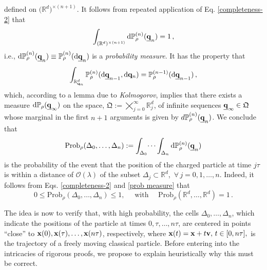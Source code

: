 \documentclass[11pt]{article}
\renewcommand{\d}{{\mathrm d}}
\begin{document}
 defined on $\big(\mathbb{R}^{d}\big)^{\times (n+1)}$. It follows from repeated application of 
 Eq. \eqref{completeness-2} that 
$$ \int_{(\mathbb{R}^{d})^{\times (n+1)}}  \d \mathbb{P}^{(n)}_{\rho}( \underline{{\bf{q}}}_{n}) =1\,,$$
i.e., $ \d\mathbb{P}^{(n)}_{\rho}(\underline{{\bf{q}}}_{n})\equiv \mathbb{P}^{(n)}_{\rho}(\d \underline{\mathbf{q}}_n)$ 
is a \textit{probability measure}. It has the property that
 $$\int_{\mathbb{R}^{d}_{{\bf{q}}_n}} \mathbb{P}^{(n)}_{\rho}(\d \underline{{\bf{q}}}_{n-1}, \d{\bf{q}}_{n}) = 
\mathbb{P}^{(n-1)}_{\rho}(\d \underline{{\bf{q}}}_{n-1})\,,$$
 which, according to a lemma due to \textit{Kolmogorov}, implies that there exists a measure 
 $\d \mathbb{P}_{\rho}(\underline{{\bf{q}}}_{\infty})$ on the space, 
 $\mathfrak{Q}:= \bigtimes_{j=0}^{\infty} \mathbb{R}_{j}^{d}$, of infinite sequences 
 $\underline{{\bf{q}}}_{\infty} \in \mathfrak{Q}$ whose marginal in the first $n+1$ arguments is given by 
 $d\mathbb{P}^{(n)}_{\rho}(\underline{{\bf{q}}}_{n})$. 
 We conclude that
 \begin{equation}\label{probas}
 \text{Prob}_{\rho}(\Delta_0, \dots, \Delta_n):= \int_{\Delta_0} \dots \int_{\Delta_n} \d\mathbb{P}^{(n)}_{\rho}(\underline{{\bf{q}}}_{n})
 \end{equation}
 is the probability of the event that the position of the charged particle at time $j\tau$ is within a distance of $\mathcal{O}(\lambda)$ of the subset $\Delta_j \subset \mathbb{R}^{d}$, \,$\forall \,j=0,1,\dots, n$. Indeed, it follows from Eqs. \eqref{completeness-2} and \eqref{prob measure} that
 \begin{equation}
 0 \leq \text{Prob}_{\rho}(\Delta_0, \dots, \Delta_n) \leq 1, \quad \text{  with  }\quad 
 \text{Prob}_{\rho}(\mathbb{R}^{d}, \dots, \mathbb{R}^{d}) =1\,.
 \end{equation}

 The idea is now to verify that, with high probability, the cells $\Delta_0,\dots, \Delta_n$, which indicate the positions of the particle at times $0, \tau, \dots, n\tau$, are centered in points ``close'' to ${\bf{x}}(0), {\bf{x}}(\tau), \dots , {\bf{x}}(n\tau)$, respectively, where 
 ${\bf{x}}(t)={\bf{x}}+t {\bf{v}},\, t\in [0, n\tau],$ is the trajectory of a freely moving classical particle. Before entering into the intricacies of rigorous proofs, we propose to explain heuristically why this must be correct.
 
\end{document}
